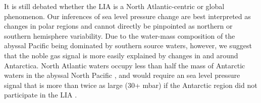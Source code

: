 \documentclass[12pt]{article}
\begin{document}
It is still debated whether the LIA is a North Atlantic-centric or global phenomenon. Our inferences of sea level pressure change are best interpreted as changes in polar regions and cannot directly be pinpointed as northern or southern hemisphere variability. Due to the water-mass composition of the abyssal Pacific being dominated by southern source waters, however, we suggest that the noble gas signal is more easily explained by changes in and around Antarctica. North Atlantic waters occupy less than half the mass of Antarctic waters in the abyssal North Pacific \cite{Johnson--2008:Quantifying}, and would require an sea level pressure signal that is more than twice as large (30+ mbar) if the Antarctic region did not participate in the LIA . 







\end{document}
